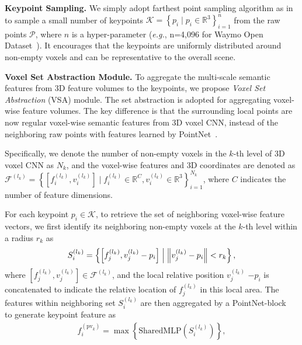 \documentclass[natbib,twocolumn]{svjour3}          \smartqed  \usepackage{graphicx}
\begin{document}
\noindent
\textbf{Keypoint Sampling.} 
We simply adopt farthest point sampling algorithm as in~\citep{qi2017pointnet++} to sample a small number of keypoints 
$\mathcal{K}=\left\{p_i\mid p_i \in \mathbb{R}^3\right\}_{i=1}^{n}$ 
from the raw points $\mathcal{P}$, where $n$ is 
a hyper-parameter 
(\emph{e.g.}, n=4,096 for Waymo Open Dataset~\citep{Sun_2020_CVPR}).
It encourages that the keypoints are uniformly distributed around non-empty voxels and can be representative to the overall scene.

\noindent
\textbf{Voxel Set Abstraction Module.}
To aggregate the multi-scale semantic features from 3D feature volumes to the keypoints, we propose \textit{Voxel Set Abstraction} (VSA) module.
The set abstraction \citep{qi2017pointnet++} is adopted for aggregating voxel-wise feature volumes. 
The key difference is that the surrounding local points are now regular voxel-wise semantic features from 3D voxel CNN, instead of the neighboring raw points with features learned by PointNet~\citep{qi2017pointnet}.

Specifically, we denote the number of non-empty voxels in the $k$-th level of 3D voxel CNN as $N_k$, and the voxel-wise features and 3D coordinates are denoted as 
$\mathcal{F}^{(l_k)}=\left\{[f_i^{(l_k)}, v_{i}^{(l_k)}]\mid f_i^{(l_k)}\in \mathbb{R}^{C}, v_{i}^{(l_k)} \in \mathbb{R}^{3} \right\}_{i=1}^{N_k}$, where $C$ indicates the number of feature dimensions.

For each keypoint $p_i\in \mathcal{K}$, to retrieve the set of neighboring voxel-wise feature vectors, we first identify its neighboring non-empty voxels at the $k$-th level within a radius $r_k$ as
\begin{align}
	S_i^{(l_k)} =\left\lbrace \left[f_j^{(l_k)}, v_j^{(l_k)} - p_i\right] \;\middle|\;
	\begin{tabular}{@{}l@{}}
		$\left\Vert v_j^{(l_k)} - p_i \right\Vert < r_k$\\
	\end{tabular}
	\right\rbrace,
\end{align}
where $[f_j^{(l_k)}, v_{j}^{(l_k)}] \in \mathcal{F}^{(l_k)}$, 
and the local relative position $v_j^{(l_k)}$ $- p_i$ is concatenated to indicate the relative location of $f_j^{(l_k)}$ in this local area.
The features within neighboring set $S_i^{(l_k)}$ are then aggregated by a PointNet-block~\citep{qi2017pointnet} to generate keypoint  feature as
\begin{align}\label{eq:pointnet}
		f_i^{(\text{pv}_k)} = \max \left\{\text{SharedMLP}\left(S_i^{(l_k)}\right)\right\},
\end{align}
\end{document}
